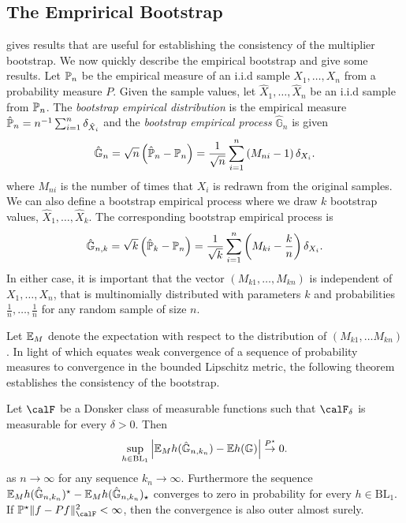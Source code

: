 \subsection{The Emprirical Bootstrap}%
\label{subsec:empirical-bootstrap}

 gives results that are useful for establishing the consistency of the multiplier bootstrap. We now quickly describe the empirical bootstrap and give some results. Let \(\P_n\) be the empirical measure of an i.i.d sample \(X_1,\dots,X_n\) from a probability measure \(P\). Given the sample values, let \(\hat X_1,\dots,\hat X_n\) be an i.i.d sample from \(\P_n\). The \emph{bootstrap empirical distribution} is the empirical measure \(\hat \P_n = n^{-1}\sum_{i=1}^n  \delta_{\hat X_i}\) and the \emph{bootstrap empirical process} \(\hat{\mathbb{G}}_n\) is given 
\[
	\hat{\mathbb{G}}_n = \sqrt{n}\left(\hat \P_n - \P_n\right) = \frac{1}{\sqrt{n}}\sum_{i=1}^n \left(M_{ni}-1\right)\delta_{X_i}
.\] 
where \(M_{ni}\) is the number of times that \(X_i\) is redrawn from the original samples. We can also define a bootstrap empirical process where we draw \(k\) bootstrap values, \(\hat X_1,\dots,\hat X_k\). The corresponding bootstrap empirical process is 
\[
	\hat{\mathbb{G}}_{n,k} = \sqrt{k}\left(\hat\P_k-\P_n\right)=\frac{1}{\sqrt{k}}\sum_{i=1}^n \left(M_{ki}-\frac{k}{n}\right)\delta_{X_i}
.\]
In either case, it is important that the vector \((M_{k1},\dots,M_{kn})\) is independent of \(X_1,\dots,X_n\), that is multinomially distributed with parameters \(k\) and probabilities \(\frac{1}{n},\dots,\frac{1}{n}\) for any random sample of size \(n\).

Let \(\E_M\) denote the expectation with respect to the distribution of \((M_{k1},\dots M_{kn})\). In light of  which equates weak convergence of a sequence of probability measures to convergence in the bounded Lipschitz metric, the following theorem establishes the consistency of the bootstrap. 
\begin{theorem}
	\label{thm:consistency-empirical-bootstrap}
	Let \(\calF\) be a Donsker class of measurable functions such that \(\calF_\delta\) is measurable for every \(\delta > 0\). Then
	\[
		\sup_{h\in\text{BL}_1}\left|\E_M h(\hat{\mathbb{G}}_{n,k_n}) - \E h(\mathbb{G})\right| \overset{P^\star}\to 0
	.\] 
	as \(n\to \infty\) for any sequence \(k_n\to \infty\). Furthermore the sequence \(\E_M h(\hat{\mathbb{G}}_{n,k_n})^\star - \E_M h(\hat{\mathbb{G}}_{n,k_n})_\star\) converges to zero in probability for every \(h\in \text{BL}_1\). If \(\P^\star\|f-Pf\|^2_\calF<\infty\), then the convergence is also outer almost surely.
\end{theorem}
